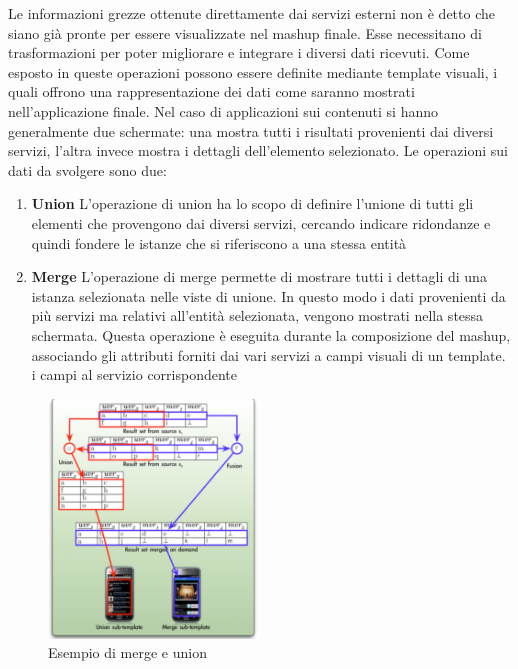 Le informazioni grezze ottenute direttamente dai servizi esterni non è detto che siano già pronte per essere visualizzate nel mashup finale. Esse necessitano di trasformazioni per poter migliorare e integrare i diversi dati ricevuti. Come esposto in \cite{caio2011tesi} queste operazioni possono essere definite mediante template visuali, i quali offrono una rappresentazione dei dati come saranno mostrati nell'applicazione finale. Nel caso di applicazioni sui contenuti si hanno generalmente due schermate: una mostra tutti i risultati provenienti dai diversi servizi, l'altra invece mostra i dettagli dell'elemento selezionato. Le operazioni sui dati da svolgere sono due:

\begin{enumerate}
	\item \textbf{Union} L'operazione di union ha lo scopo di definire l'unione di tutti gli elementi che provengono dai diversi servizi, cercando indicare ridondanze e quindi fondere le istanze che si riferiscono a una stessa entità
	\item \textbf{Merge} L'operazione di merge permette di mostrare tutti i dettagli di una istanza selezionata nelle viste di unione. In questo modo i dati provenienti da più servizi ma relativi all'entità selezionata, vengono mostrati nella stessa schermata. Questa operazione è eseguita durante la composizione del mashup, associando gli attributi forniti dai vari servizi a campi visuali di un template. i campi al servizio corrispondente
\end{enumerate}

\begin{figure}[ht]
	\centering
	\includegraphics[width=0.5\textwidth]{2-nozioni-preliminari/Immagini/merge-union.png}
	\caption{Esempio di merge e union}\label{fig:merge-union}
\end{figure}

